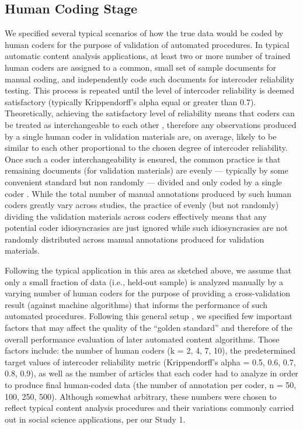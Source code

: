 \documentclass[man, 12pt, a4paper, nolmodern, noextraspace]{apa6}
\begin{document}
    \subsection{Human Coding Stage}
    
    We specified several typical scenarios of how the true data would be coded by human coders for the purpose of validation of automated procedures. In typical automatic content analysis applications, at least two or more number of trained human coders are assigned to a common, small set of sample documents for manual coding, and independently code such documents for intercoder reliability testing. This process is repeated until the level of intercoder reliability is deemed satisfactory (typically Krippendorff’s alpha equal or greater than 0.7). Theoretically, achieving the satisfactory level of reliability means that coders can be treated as interchangeable to each other \parencite{krippendorff2004reliability}, therefore any observations produced by a single human coder in validation materials are, on average, likely to be similar to each other proportional to the chosen degree of intercoder reliability. Once such a coder interchangeability is ensured, the common practice is that remaining documents (for validation materials) are evenly --- typically by some convenient standard but non randomly --- divided and only coded by a single coder \parencite{grimmer2018unreliability}. While the total number of manual annotations produced by such human coders greatly vary across studies, the practice of evenly (but not randomly) dividing the validation materials across coders effectively means that any potential coder idiosyncrasies are just ignored while such idiosyncrasies are not randomly distributed across manual annotations produced for validation materials.      
    
    Following the typical application in this area as sketched above, we assume that only a small fraction of data (i.e., held-out sample) is analyzed manually by a varying number of human coders for the purpose of providing a cross-validation result (against machine algorithms) that informs the performance of such automated procedures. Following this general setup \parencites[e.g.,][]{grimmer2018unreliability}, we specified few important factors that may affect the quality of the “golden standard” and therefore of the overall performance evaluation of later automated content algorithms. Those factors include: the number of human coders (k = 2, 4, 7, 10), the predetermined target values of intercoder reliability metric (Krippendorff's alpha = 0.5, 0.6, 0.7, 0.8, 0.9), as well as the number of articles that each coder had to analyze in order to produce final human-coded data (the number of annotation per coder, n = 50, 100, 250, 500). Although somewhat arbitrary, these numbers were chosen to reflect typical content analysis procedures and their variations commonly carried out in social science applications, per our Study 1. 
    
\end{document}
